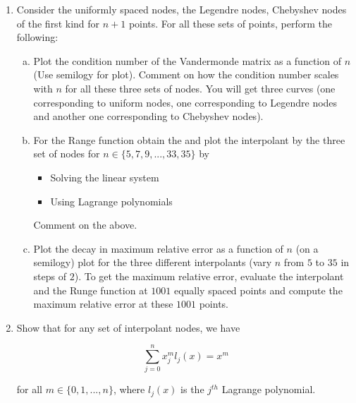 \documentclass{article}
\begin{document}
\begin{enumerate}
\item Consider the uniformly spaced nodes, the Legendre nodes, Chebyshev nodes of the first kind for $n+1$ points. For all these sets of points, perform the following:

\begin{enumerate}[(a)]
\item Plot the condition number of the Vandermonde matrix as a function of $n$ (Use semilogy for plot). Comment on how the condition number scales with $n$ for all these three sets of nodes. You will get three curves (one corresponding to uniform nodes, one corresponding to Legendre nodes and another one corresponding to Chebyshev nodes).
\item For the Range function obtain the and plot the interpolant by the three set of nodes for $n \in \{5,7,9,...,33,35\}$ by

\begin{itemize}
\item Solving the linear system
\item Using Lagrange polynomials
\end{itemize}

Comment on the above.

\item Plot the decay in maximum relative error as a function of $n$ (on a semilogy) plot for the three different interpolants (vary $n$ from $5$ to $35$ in steps of $2$). To get the maximum relative error, evaluate the interpolant and the Runge function at $1001$ equally spaced points and compute the maximum relative error at these $1001$ points.

\end{enumerate}

\item Show that for any set of interpolant nodes, we have

    $$\displaystyle \sum_{j=0}^{n} x_{j}^{m} l_{j}(x) = x^{m} $$

for all $m \in \{0,1,...,n\}$, where $l_{j}(x)$ is the $j^{th}$ Lagrange polynomial.
\end{enumerate}
\end{document}
